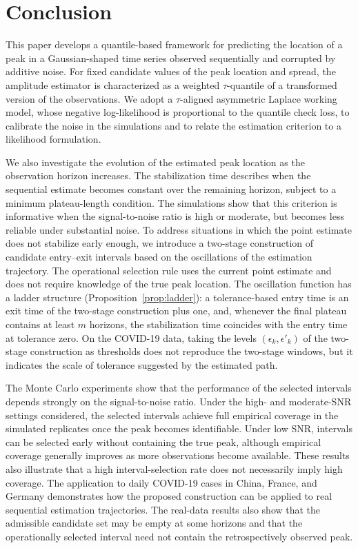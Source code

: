 \documentclass[12pt,a4paper]{article}
\begin{document}
\section{Conclusion}
\label{sec:conclusion}

This paper develops a quantile-based framework for predicting the
location of a peak in a Gaussian-shaped time series observed sequentially
and corrupted by additive noise. For fixed candidate values of the
peak location and spread, the amplitude estimator is characterized as
a weighted $\tau$-quantile of a transformed version of the observations.
We adopt a $\tau$-aligned asymmetric Laplace working model, whose
negative log-likelihood is proportional to the quantile check loss, to
calibrate the noise in the simulations and to relate the estimation
criterion to a likelihood formulation.

We also investigate the evolution of the estimated peak location as
the observation horizon increases. The stabilization time describes
when the sequential estimate becomes constant over the remaining
horizon, subject to a minimum plateau-length condition. The simulations
show that this criterion is informative when the signal-to-noise ratio
is high or moderate, but becomes less reliable under substantial noise.
To address situations in which the point estimate does not stabilize
early enough, we introduce a two-stage construction of candidate
entry--exit intervals based on the oscillations of the estimation
trajectory. The operational selection rule uses the current point
estimate and does not require knowledge of the true peak location.
The oscillation function has a ladder structure
(Proposition~\ref{prop:ladder}): a tolerance-based entry time is an exit time of the two-stage construction plus one, and, whenever the final plateau contains at least \(m\) horizons, the stabilization time coincides with the entry time at tolerance zero.
On the COVID-19 data,
taking the levels $(\epsilon_k,\epsilon'_k)$ of the two-stage construction
as thresholds does not reproduce the two-stage windows, but it indicates
the scale of tolerance suggested by the estimated path.

The Monte Carlo experiments show that the performance of the selected
intervals depends strongly on the signal-to-noise ratio. Under the
high- and moderate-SNR settings considered, the selected intervals
achieve full empirical coverage in the simulated replicates once the
peak becomes identifiable. Under low SNR, intervals can be selected
early without containing the true peak, although empirical coverage
generally improves as more observations become available. These results
also illustrate that a high interval-selection rate does not necessarily
imply high coverage. The application to daily COVID-19 cases in China,
France, and Germany demonstrates how the proposed construction can be
applied to real sequential estimation trajectories. The real-data
results also show that the admissible candidate set may be empty at
some horizons and that the operationally selected interval need not
contain the retrospectively observed peak.
\end{document}
